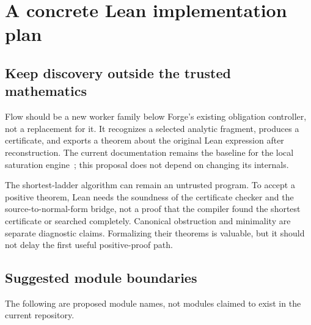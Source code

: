 \section{A concrete Lean implementation plan}
\label{sec:lean}

\subsection{Keep discovery outside the trusted mathematics}

Flow should be a new worker family below Forge's existing obligation controller, not a replacement for it. It recognizes a selected analytic fragment, produces a certificate, and exports a theorem about the original Lean expression after reconstruction. The current  documentation remains the baseline for the local saturation engine~\cite{grind}; this proposal does not depend on changing its internals.

The shortest-ladder algorithm can remain an untrusted program. To accept a positive theorem, Lean needs the soundness of the certificate checker and the source-to-normal-form bridge, not a proof that the compiler found the shortest certificate or searched completely. Canonical obstruction and minimality are separate diagnostic claims. Formalizing their theorems is valuable, but it should not delay the first useful positive-proof path.

\subsection{Suggested module boundaries}

The following are proposed module names, not modules claimed to exist in the current repository.

